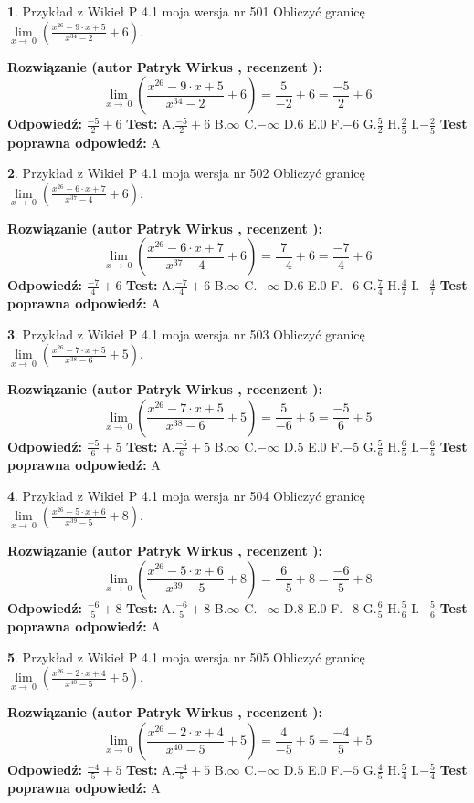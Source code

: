 \documentclass[12pt, a4paper]{article}
\theoremstyle{definition} %
\newtheorem{zad}{}
\newcommand{\zadStart}[1]{\begin{zad}#1\newline}
\newcommand{\zadStop}{\end{zad}}
\newcommand{\rozwStart}[2]{\noindent \textbf{Rozwiązanie (autor #1 , recenzent #2): }\newline}
\newcommand{\rozwStop}{\newline}
\newcommand{\odpStart}{\noindent \textbf{Odpowiedź:}\newline}
\newcommand{\odpStop}{\newline}
\newcommand{\testStart}{\noindent \textbf{Test:}\newline}
\newcommand{\testStop}{\newline}
\newcommand{\kluczStart}{\noindent \textbf{Test poprawna odpowiedź:}\newline}
\newcommand{\kluczStop}{\newline}
\begin{document}
\zadStart{Przykład z Wikieł P 4.1 moja wersja nr 501}
Obliczyć granicę $\lim\limits_{x\to\ 0}(\frac{x^{26}-9 \cdot x +5}{x^{34}-2}+6)$.
\zadStop
\rozwStart{Patryk Wirkus}{}
$$\lim\limits_{x\to\ 0}(\frac{x^{26}-9 \cdot x +5}{x^{34}-2}+6)=\frac{5}{-2}+6=\frac{-5}{2}+6$$
\rozwStop
\odpStart
$\frac{-5}{2}+6$
\odpStop
\testStart
A.$\frac{-5}{2}+6$
B.$\infty$
C.$-\infty$
D.$6$
E.$0$
F.$-6$
G.$\frac{5}{2}$
H.$\frac{2}{5}$
I.$-\frac{2}{5}$
\testStop
\kluczStart
A
\kluczStop



\zadStart{Przykład z Wikieł P 4.1 moja wersja nr 502}
Obliczyć granicę $\lim\limits_{x\to\ 0}(\frac{x^{26}-6 \cdot x +7}{x^{37}-4}+6)$.
\zadStop
\rozwStart{Patryk Wirkus}{}
$$\lim\limits_{x\to\ 0}(\frac{x^{26}-6 \cdot x +7}{x^{37}-4}+6)=\frac{7}{-4}+6=\frac{-7}{4}+6$$
\rozwStop
\odpStart
$\frac{-7}{4}+6$
\odpStop
\testStart
A.$\frac{-7}{4}+6$
B.$\infty$
C.$-\infty$
D.$6$
E.$0$
F.$-6$
G.$\frac{7}{4}$
H.$\frac{4}{7}$
I.$-\frac{4}{7}$
\testStop
\kluczStart
A
\kluczStop



\zadStart{Przykład z Wikieł P 4.1 moja wersja nr 503}
Obliczyć granicę $\lim\limits_{x\to\ 0}(\frac{x^{26}-7 \cdot x +5}{x^{38}-6}+5)$.
\zadStop
\rozwStart{Patryk Wirkus}{}
$$\lim\limits_{x\to\ 0}(\frac{x^{26}-7 \cdot x +5}{x^{38}-6}+5)=\frac{5}{-6}+5=\frac{-5}{6}+5$$
\rozwStop
\odpStart
$\frac{-5}{6}+5$
\odpStop
\testStart
A.$\frac{-5}{6}+5$
B.$\infty$
C.$-\infty$
D.$5$
E.$0$
F.$-5$
G.$\frac{5}{6}$
H.$\frac{6}{5}$
I.$-\frac{6}{5}$
\testStop
\kluczStart
A
\kluczStop



\zadStart{Przykład z Wikieł P 4.1 moja wersja nr 504}
Obliczyć granicę $\lim\limits_{x\to\ 0}(\frac{x^{26}-5 \cdot x +6}{x^{39}-5}+8)$.
\zadStop
\rozwStart{Patryk Wirkus}{}
$$\lim\limits_{x\to\ 0}(\frac{x^{26}-5 \cdot x +6}{x^{39}-5}+8)=\frac{6}{-5}+8=\frac{-6}{5}+8$$
\rozwStop
\odpStart
$\frac{-6}{5}+8$
\odpStop
\testStart
A.$\frac{-6}{5}+8$
B.$\infty$
C.$-\infty$
D.$8$
E.$0$
F.$-8$
G.$\frac{6}{5}$
H.$\frac{5}{6}$
I.$-\frac{5}{6}$
\testStop
\kluczStart
A
\kluczStop



\zadStart{Przykład z Wikieł P 4.1 moja wersja nr 505}
Obliczyć granicę $\lim\limits_{x\to\ 0}(\frac{x^{26}-2 \cdot x +4}{x^{40}-5}+5)$.
\zadStop
\rozwStart{Patryk Wirkus}{}
$$\lim\limits_{x\to\ 0}(\frac{x^{26}-2 \cdot x +4}{x^{40}-5}+5)=\frac{4}{-5}+5=\frac{-4}{5}+5$$
\rozwStop
\odpStart
$\frac{-4}{5}+5$
\odpStop
\testStart
A.$\frac{-4}{5}+5$
B.$\infty$
C.$-\infty$
D.$5$
E.$0$
F.$-5$
G.$\frac{4}{5}$
H.$\frac{5}{4}$
I.$-\frac{5}{4}$
\testStop
\kluczStart
A
\kluczStop
\end{document}
